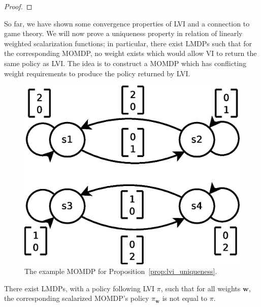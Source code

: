 \begin{proof}

\end{proof}

So far, we have shown some convergence properties of LVI and a connection to game theory. We will now prove a uniqueness property in relation of linearly weighted scalarization functions; in particular, there exist LMDPs such that for the corresponding MOMDP, no weight exists which would allow VI to return the same policy as LVI. The idea is to construct a MOMDP which has conflicting weight requirements to produce the policy returned by LVI.


\begin{figure}%
\begin{center}
    \includegraphics[width=0.75\linewidth]{momdp.eps}
    \caption{The example MOMDP for Proposition~\ref{prop:lvi_uniqueness}.}
    \label{fig:example_momdp}
\end{center}
\end{figure}


\begin{proposition}
    \label{prop:lvi_uniqueness}
    There exist LMDPs, with a policy following LVI $\pi$, such that for all weights $\mathbf{w}$, the corresponding scalarized MOMDP's policy $\pi_{\mathbf{w}}$ is not equal to $\pi$.
\end{proposition}

